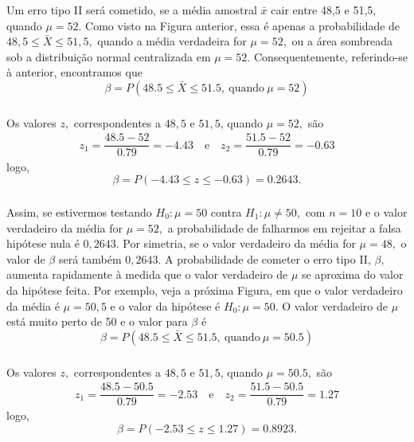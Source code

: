 \documentclass[14pt,aspectratio=1610]{beamer}
\newcommand{\bx}{\ensuremath{\bar{x}}}
\newcommand{\Ho}{\ensuremath{H_{0}}}
\newcommand{\Hi}{\ensuremath{H_{1}}}
\begin{document}
\begin{frame}{}
\frametitle{}
\begin{block}{}
\justifying
Um erro tipo II será cometido, se a média amostral $\bx$ cair entre 48,5 e 51,5, quando $\mu = 52.$ Como visto na Figura anterior, essa é apenas a probabilidade de 
$48,5 \leq \bar{X} \leq 51,5,$ quando a média verdadeira for $\mu = 52,$ ou a área sombreada sob a distribuição normal centralizada em $\mu = 52.$ Consequentemente, 
referindo-se à anterior, encontramos que $$\beta=P(48.5\leq\bar{X}\leq 51.5,\ \textrm{quando}\ \mu=52)$$
\end{block}
\end{frame}

\begin{frame}{}
\frametitle{}
\begin{block}{}
Os valores $z,$ correspondentes a $48,5$ e $51,5$, quando $\mu = 52,$ são
\begin{align*}
z_{1}=\dfrac{48.5-52}{0.79}=-4.43\quad \textrm{e}\quad z_{2}=\dfrac{51.5-52}{0.79}=-0.63
\end{align*}
logo, $$\beta=P(-4.43\leq z\leq -0.63)=0.2643.$$
\end{block}
\end{frame}

\begin{frame}{}
\frametitle{}
\begin{block}{}
\justifying
Assim, se estivermos testando $\Ho: \mu = 50$ contra $\Hi: \mu \neq 50,$ com $n = 10$ e o valor verdadeiro da média for $\mu = 52,$ a probabilidade de falharmos em 
rejeitar a falsa hipótese nula é $0,2643.$ Por simetria, se o valor verdadeiro da média for $\mu = 48,$ o valor de $\beta$ será também $0,2643.$ A probabilidade de 
cometer o erro tipo II, $\beta,$ aumenta rapidamente à medida que o valor verdadeiro de $\mu$ se aproxima do valor da hipótese feita. Por exemplo, veja a próxima 
Figura, em que o valor verdadeiro da média é $\mu = 50,5$ e o valor da hipótese é $\Ho: \mu = 50.$ O valor verdadeiro de $\mu$ está muito perto de 50 e o valor para 
$\beta$ é $$\beta=P(48.5\leq\bar{X}\leq 51.5,\ \textrm{quando}\ \mu=50.5)$$
\end{block}
\end{frame}

\begin{frame}{}
\frametitle{}
\begin{block}{}
\justifying
Os valores $z,$ correspondentes a $48,5$ e $51,5$, quando $\mu = 50.5,$ são
\begin{align*}
z_{1}=\dfrac{48.5-50.5}{0.79}=-2.53\quad \textrm{e}\quad z_{2}=\dfrac{51.5-50.5}{0.79}=1.27
\end{align*}
logo, $$\beta=P(-2.53\leq z\leq 1.27)=0.8923.$$
\end{block}
\end{frame}
\end{document}
